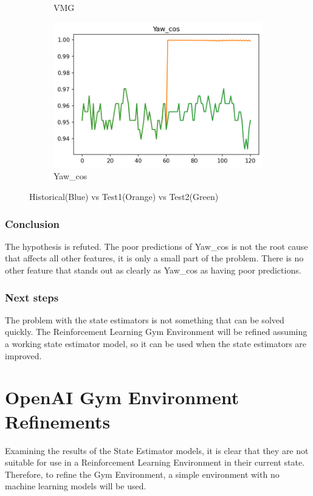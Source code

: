 \documentclass[12pt,twoside]{report}
\begin{document}
\begin{figure}[h]
\begin{subfigure}[b]{0.32\textwidth}
         \caption{VMG}
     \end{subfigure}
     \begin{subfigure}[b]{0.32\textwidth}
         \centering
         \includegraphics[width=\textwidth]{figures/prediction-plots-compared/Yaw_cos.png}
         \caption{Yaw\_cos}
     \end{subfigure}
        \caption{Historical(Blue) vs Test1(Orange) vs Test2(Green)}
        \label{fig:prediction-Yaw-cos}
\end{figure}

\subsubsection{Conclusion}
The hypothesis is refuted. The poor predictions of Yaw\_cos is not the root cause that affects all other features, it is only a small part of the problem. There is no other feature that stands out as clearly as Yaw\_cos as having poor predictions.

\subsubsection{Next steps}
The problem with the state estimators is not something that can be solved quickly. The Reinforcement Learning Gym Environment will be refined assuming a working state estimator model, so it can be used when the state estimators are improved.

\section{OpenAI Gym Environment Refinements}
Examining the results of the State Estimator models, it is clear that they are not suitable for use in a Reinforcement Learning Environment in their current state. Therefore, to refine the Gym Environment, a simple environment with no machine learning models will be used.
\end{document}
